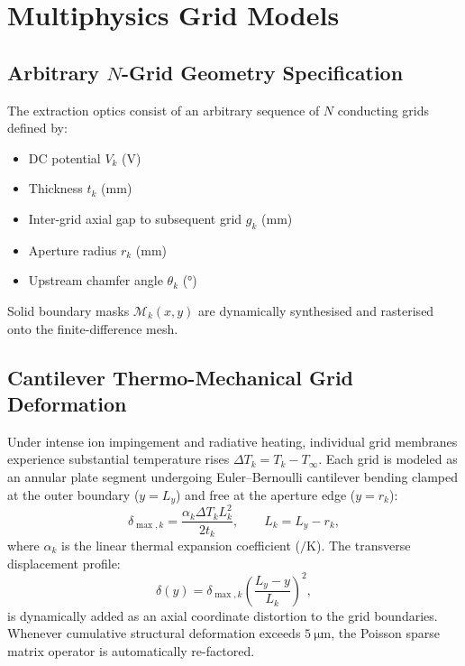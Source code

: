 \documentclass[11pt,a4paper]{article}
\begin{document}
\section{Multiphysics Grid Models}

\subsection{Arbitrary $N$-Grid Geometry Specification}

The extraction optics consist of an arbitrary sequence of $N$ conducting grids defined by:
\begin{itemize}[nosep]
    \item DC potential $V_k$ (\si{\volt})
    \item Thickness $t_k$ (\si{\milli\meter})
    \item Inter-grid axial gap to subsequent grid $g_k$ (\si{\milli\meter})
    \item Aperture radius $r_k$ (\si{\milli\meter})
    \item Upstream chamfer angle $\theta_k$ (\si{\degree})
\end{itemize}

Solid boundary masks $\mathcal{M}_k(x,y)$ are dynamically synthesised and rasterised onto the finite-difference mesh.

\subsection{Cantilever Thermo-Mechanical Grid Deformation}

Under intense ion impingement and radiative heating, individual grid membranes experience substantial temperature rises $\Delta T_k = T_k - T_{\infty}$. Each grid is modeled as an annular plate segment undergoing Euler--Bernoulli cantilever bending clamped at the outer boundary ($y = L_y$) and free at the aperture edge ($y = r_k$):
\begin{equation}
    \delta_{\max,k} = \frac{\alpha_k \Delta T_k L_k^2}{2 t_k}, \qquad L_k = L_y - r_k,
\end{equation}
where $\alpha_k$ is the linear thermal expansion coefficient ($\si{\per\kelvin}$). The transverse displacement profile:
\begin{equation}
    \delta(y) = \delta_{\max,k} \left(\frac{L_y - y}{L_k}\right)^2,
\end{equation}
is dynamically added as an axial coordinate distortion to the grid boundaries. Whenever cumulative structural deformation exceeds $\SI{5}{\micro\meter}$, the Poisson sparse matrix operator is automatically re-factored.
\end{document}
